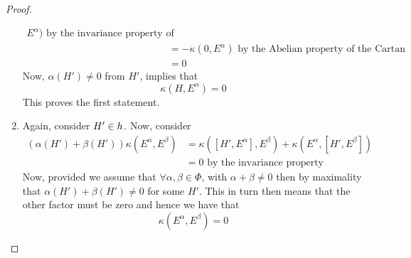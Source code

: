 \begin{thm}
\begin{proof}
\begin{enumerate}
\begin{align*}
								  E^ \alpha ) \text{ by the invariance 
								  property of the Killing form }\\
								  &=  - \kappa ( 0 , E ^ \alpha )  \text{ 
								  by the Abelian property of the 
							  Cartan subalgebra }\\
								  &=  0  
		\end{align*}
		Now, $ \alpha ( H ' ) \neq 0 $ from $ H ' $, implies 
		that 
		 \[
			 \kappa ( H , E ^{ \alpha } ) = 0 
		 \] This proves the first statement. 
	\item Again, consider $ H ' \in h $. Now, consider 
		\begin{align*}
			( \alpha ( H ') + \beta ( H ' ) ) \kappa ( E ^ \alpha , 
			E ^ \beta )  &=  \kappa ( [ H ' , E ^ \alpha ] , E ^ \beta )  
			+ \kappa ( E ^ \alpha , [ H ' , E ^ \beta ] ) \\
			 &=  0  \text{ by the invariance property} 
		\end{align*}
		Now, provided we assume that $ \forall \alpha, \beta \in \Phi$, 
		with $ \alpha + \beta \neq 0 $ then by maximality that 
		$ \alpha ( H ' ) + \beta ( H ' ) \neq 0 $  for some $ H ' $. 
		This in turn then means that the other 
		factor must be zero and hence we have that 
		\[
		 \kappa ( E ^ \alpha , E ^ \beta ) = 0 
		\] 
	
\end{enumerate}
\end{proof}
\end{thm}

